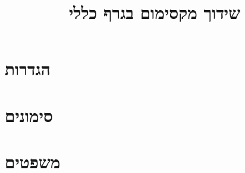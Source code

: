 \documentclass[]{article}
\title{שידוך מקסימום בגרף כללי}
\author{}
\date{}
\begin{document}
\maketitle

\section{הגדרות}

\section{סימונים}

\section{משפטים}

\end{document}
